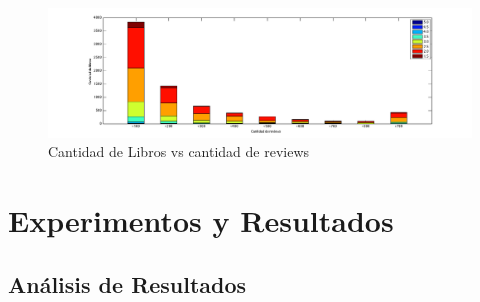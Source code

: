 \documentclass[12pt,journal,compsoc]{IEEEtran}
\begin{document}
\begin{figure}[H]
  \includegraphics[width=8.0in]{imgs/cantLibrosVScantReviews.png}
  \caption{Cantidad de Libros vs cantidad de reviews}
\end{figure}

\section{Experimentos y Resultados}

\subsection{Análisis de Resultados}
\end{document}
